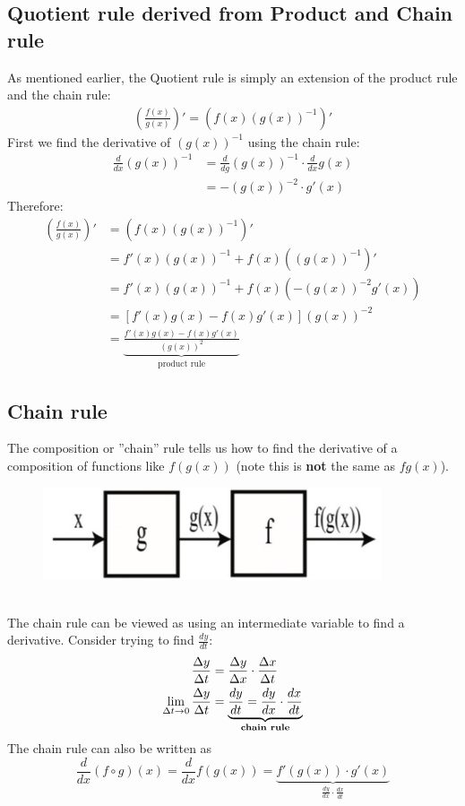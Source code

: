 \documentclass{report}
\begin{document}
\subsection{Quotient rule derived from Product and Chain rule} %
As mentioned earlier, the Quotient rule is simply an extension of the product rule and the
chain rule:
\begin{align*}
\left(\frac{f(x)}{g(x)}\right)'=(f(x)(g(x))^{-1})'
\end{align*}
First we find the derivative of $(g(x))^{-1}$ using the chain rule:
\begin{align*}
\frac{d}{dx}(g(x))^{-1}&=\frac{d}{dg}(g(x))^{-1}\cdot\frac{d}{dx}g(x)\\
&=-(g(x))^{-2}\cdot g'(x)
\end{align*}
Therefore:
\begin{align*}
\left(\frac{f(x)}{g(x)}\right)'&=(f(x)(g(x))^{-1})'\\
&=f'(x)(g(x))^{-1}+f(x)((g(x))^{-1})'\\
&=f'(x)(g(x))^{-1}+f(x)(-(g(x))^{-2}g'(x))\\
&=\left[f'(x)g(x)-f(x)g'(x)\right](g(x))^{-2}\\
&=\underbrace{\frac{f'(x)g(x)-f(x)g'(x)}{(g(x))^2}}_{\text{product rule}}
\end{align*}
\newpage

\subsection{Chain rule} %
The composition or ''chain'' rule tells us how to find the derivative of a composition of
functions like $f(g(x))$ (note this is \textbf{not} the same as $fg(x)$).
\begin{figure}[h]
\includegraphics[width=10cm]{Capture13}
\centering\\
\end{figure}\\
The chain rule can be viewed as using an intermediate variable to find a derivative. Consider
trying to find $\frac{dy}{dt}$:
\begin{align*}
\frac{\Delta y}{\Delta t}&=\frac{\Delta y}{\Delta x}\cdot\frac{\Delta x}{\Delta t}\\
\lim_{\Delta t\to0}\frac{\Delta y}{\Delta t}&=
\underbrace{\frac{dy}{dt}=\frac{dy}{dx}\cdot\frac{dx}{dt}}_{\text{\textbf{chain rule}}}
\end{align*}
The chain rule can also be written as
\begin{equation*}
\frac{d}{dx}(f\circ g)(x)=\frac{d}{dx}f(g(x))=\underbrace{f'(g(x))\cdot g'(x)}
_{\frac{dy}{dx}\cdot\frac{dx}{dt}}
\end{equation*}
\end{document}
